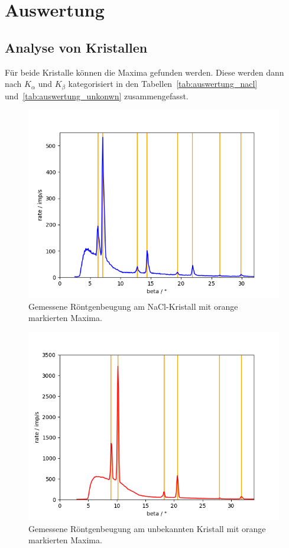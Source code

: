 \documentclass{article}
\begin{document}
\section{Auswertung}
\subsection{Analyse von Kristallen}
Für beide Kristalle können die Maxima gefunden werden. Diese werden dann nach $K_\alpha$ und $K_\beta$ kategorisiert in den Tabellen~\ref{tab:auswertung_nacl} und~\ref{tab:auswertung_unkonwn} zusammengefasst.

\begin{figure}[H]
\includegraphics[scale=0.7]{daten_nacl.png}
\caption{Gemessene Röntgenbeugung am NaCl-Kristall mit orange markierten Maxima.}
\end{figure}



\begin{figure}[H]
\includegraphics[scale=0.7]{daten_kristall.png}
\caption{Gemessene Röntgenbeugung am unbekannten Kristall mit orange markierten Maxima.}
\end{figure}
\end{document}
